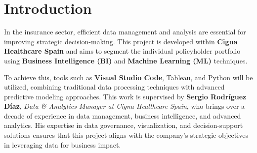 \section{Introduction}

In the insurance sector, efficient data management and analysis are essential for improving strategic decision-making. This project is developed within \textbf{Cigna Healthcare Spain} and aims to segment the individual policyholder portfolio using \textbf{Business Intelligence (BI)} and \textbf{Machine Learning (ML)} techniques.

To achieve this, tools such as \textbf{Visual Studio Code}, Tableau, and Python will be utilized, combining traditional data processing techniques with advanced predictive modeling approaches. This work is supervised by \textbf{Sergio Rodríguez Díaz}, \textit{Data \& Analytics Manager at Cigna Healthcare Spain}, who brings over a decade of experience in data management, business intelligence, and advanced analytics. His expertise in data governance, visualization, and decision-support solutions ensures that this project aligns with the company’s strategic objectives in leveraging data for business impact.